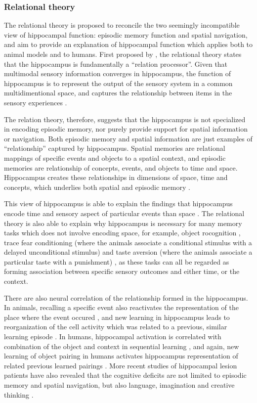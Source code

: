 \subsubsection{Relational theory}

The relational theory is proposed to reconcile the two seemingly incompatible view of hippocampal function: episodic memory function and spatial navigation, and aim to provide an explanation of hippocampal function which applies both to animal models and to humans. First proposed by \citet{eichenbaum93}, the relational theory states that the hippocampus is fundamentally a ``relation processor''. Given that multimodal sensory information converges in hippocampus, the function of hippocampus is to represent the output of the sensory system in a common multidimentional space, and captures the relationship between items in the sensory experiences \citep{eichenbaum93}.

The relation theory, therefore, suggests that the hippocampus is not specialized in encoding episodic memory, nor purely provide support for spatial information or navigation. Both episodic memory and spatial information are just examples of ``relationship'' captured by hippocampus. Spatial memories are relational mappings of specific events and objects to a spatial context, and episodic memories are relationship of concepts, events, and objects to time and space. Hippocampus creates these relationships in dimensions of space, time and concepts, which underlies both spatial and episodic memory \citep{
eichenbaum14}.

This view of hippocampus is able to explain the findings that hippocampus encode time and sensory aspect of particular events than space \citep{hampson93, young94, wood99, moser08}. The relational theory is also able to explain why hippocampus is necessary for many memory tasks which does not involve encoding space, for example, object rocognition \citep{eacott04, langston10}, trace fear conditioning (where the animals associate a conditional stimulus with a delayed unconditional stimulus) \citep{crestani02, mcechron06} and taste aversion (where the animals associate a particular taste with a punishment) \citep{best73, gallo95}, as these tasks can all be regarded as forming association between specific sensory outcomes and either time, or the context. 

There are also neural correlation of the relationship formed in the hippocampus. In animals, recalling a specific event also reactivates the representation of the place where the event occured \citep{moita03, itskov11}, and new learning in hippocampus leads to reorganization of the cell activity which was related to a previous, similar learning episode \citep{mckenzie13}. In humans, hippocampal activation is correlated with combination of the object and context in sequential learning \citep{hsieh14}, and again, new learning of object pairing in humans activates hippocampus representation of related previous learned pairings \citep{zeithamova12}. More recent studies of hippocampal lesion patients have also revealed that the cognitive deficits are not limited to episodic memory and spatial navigation, but also language, imagination and creative thinking \citep{duff09, duff13}.


